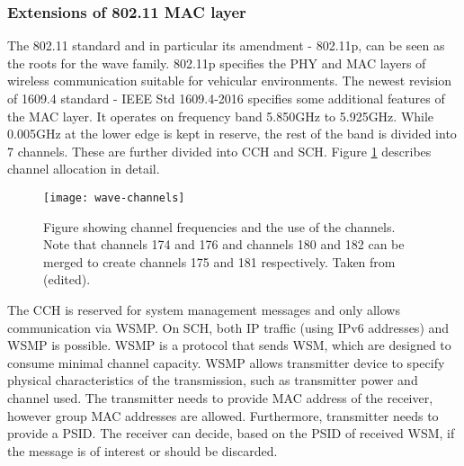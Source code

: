\subsubsection*{Extensions of 802.11 MAC layer} 
The 802.11 standard and in particular its amendment - 802.11p, can be seen as the roots for the \acrshort{wave} family. 802.11p specifies the \acrshort{PHY} and \acrshort{MAC} layers of wireless communication suitable for vehicular environments. The newest revision of 1609.4 standard - \acrshort{IEEE} Std 1609.4-2016 specifies some additional features of the \acrshort{MAC} layer. It operates on frequency band 5.850GHz to 5.925GHz. While 0.005GHz at the lower edge is kept in reserve, the rest of the band is divided into 7 channels. These are further divided into \acrfull{CCH} and \acrfull{SCH}. Figure \ref{fig:wave-channels} describes channel allocation in detail.\par
% 
\begin{figure}[ht]
    \centering
    \texttt{[image: wave-channels]}
    \caption{Figure showing channel frequencies and the use of the channels. Note that channels 174 and 176 and channels 180 and 182 can be merged to create channels 175 and 181 respectively. Taken from \cite[p. 20]{VehicularTechnologySociety2014IEEEArchitecture} (edited).}
    \label{fig:wave-channels}
\end{figure}
% 
The \acrshort{CCH} is reserved for system management messages and only allows communication via \acrfull{WSMP}. On \acrshort{SCH}, both \acrshort{IP} traffic (using IPv6 addresses) and \acrshort{WSMP} is possible. \acrshort{WSMP} is a protocol that sends \acrfull{WSM}, which are designed to consume minimal channel capacity. \acrshort{WSMP} allows transmitter device to specify physical characteristics of the transmission, such as transmitter power and channel used. The transmitter needs to provide MAC address of the receiver, however group MAC addresses are allowed. Furthermore, transmitter needs to provide a \acrfull{PSID}\footnotemark. The receiver can decide, based on the \acrshort{PSID} of received \acrshort{WSM}, if the message is of interest or should be discarded.\par
% 
% 
